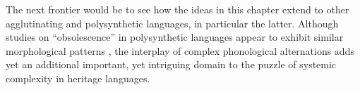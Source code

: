 \documentclass[output=paper,colorlinks,citecolor=brown,footheight=42pt]{langscibook}
\begin{document}
The next frontier would be to see how the ideas in this chapter extend to other agglutinating and polysynthetic languages, in particular the latter. Although studies on “obsolescence” in polysynthetic languages appear to exhibit similar morphological patterns \citep{mithun1989incipient,gruzdeva&vakhtin2017}, the interplay of complex phonological alternations adds yet an additional important, yet intriguing domain to the puzzle of systemic complexity in heritage languages.







\end{document}
